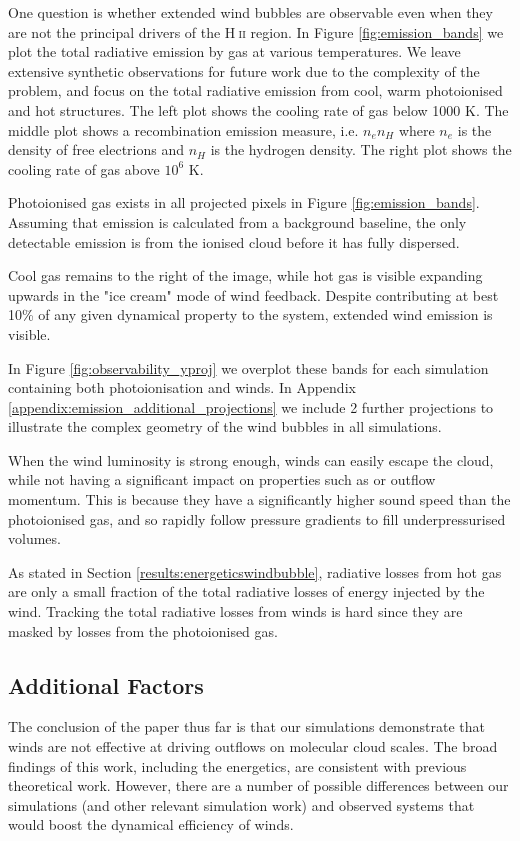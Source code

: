 \documentclass[a4paper,fleqn,usenatbib]{mnras}
\newcommand{\HII}{H$~$\textsc{ii}\xspace}
\begin{document}
One question is whether extended wind bubbles are observable even when they are not the principal drivers of the \HII region. In Figure \ref{fig:emission_bands} we plot the total radiative emission by gas at various temperatures. We leave extensive synthetic observations for future work due to the complexity of the problem, and focus on the total radiative emission from cool, warm photoionised and hot structures. The left plot shows the cooling rate of gas below 1000 K. The middle plot shows a recombination emission measure, i.e. $n_e n_H$ where $n_e$ is the density of free electrions and $n_H$ is the hydrogen density. The right plot shows the cooling rate of gas above $10^6$ K.

Photoionised gas exists in all projected pixels in Figure \ref{fig:emission_bands}. Assuming that emission is calculated from a background baseline, the only detectable emission is from the ionised cloud before it has fully dispersed.

Cool gas remains to the right of the image, while hot gas is visible expanding upwards in the "ice cream" mode of wind feedback. Despite contributing at best 10\% of any given dynamical property to the system, extended wind emission is visible.

In Figure \ref{fig:observability_yproj} we overplot these bands for each simulation containing both photoionisation and winds. In Appendix \ref{appendix:emission_additional_projections} we include 2 further projections to illustrate the complex geometry of the wind bubbles in all simulations.

When the wind luminosity is strong enough, winds can easily escape the cloud, while not having a significant impact on properties such as \SFE or outflow momentum. This is because they have a significantly higher sound speed than the photoionised gas, and so rapidly follow pressure gradients to fill underpressurised volumes.

As stated in Section \ref{results:energeticswindbubble}, radiative losses from hot gas are only a small fraction of the total radiative losses of energy injected by the wind. Tracking the total radiative losses from winds is hard since they are masked by losses from the photoionised gas.

\subsection{Additional Factors}
\label{effective:intheend}

The conclusion of the paper thus far is that our simulations demonstrate that winds are not effective at driving outflows on molecular cloud scales. The broad findings of this work, including the energetics, are consistent with previous theoretical work. However, there are a number of possible differences between our simulations (and other relevant simulation work) and observed systems that would boost the dynamical efficiency of winds. 
\end{document}
